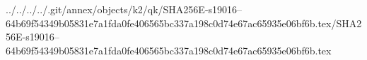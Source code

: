 ../../../../.git/annex/objects/k2/qk/SHA256E-s19016--64b69f54349b05831e7a1fda0fe406565bc337a198c0d74e67ac65935e06bf6b.tex/SHA256E-s19016--64b69f54349b05831e7a1fda0fe406565bc337a198c0d74e67ac65935e06bf6b.tex